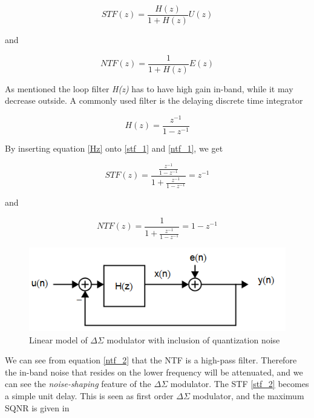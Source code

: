 \begin{equation}\label{stf_1}
    STF(z) = \frac{H(z)}{1+H(z)}U(z)
\end{equation}

and

\begin{equation}\label{ntf_1}
    NTF(z) = \frac{1}{1+H(z)}E(z)
\end{equation}

As mentioned the loop filter \textit{H(z)} has to have high gain in-band, while it may decrease outside. A commonly used filter is the delaying discrete time integrator

\begin{equation}\label{Hz}
    H(z) = \frac{z^{-1}}{1-z^{-1}}
\end{equation}

By inserting equation \ref{Hz} onto \ref{stf_1} and \ref{ntf_1}, we get

\begin{equation}\label{stf_2}
    STF(z) = \frac{\frac{z^{-1}}{1-z^{-1}}}{1 + \frac{z^{-1}}{1-z^{-1}}} = z^{-1}
\end{equation}

and

\begin{equation}\label{ntf_2}
    NTF(z) = \frac{1}{1 + \frac{z^{-1}}{1 - z^{-1}}} = 1 - z^{-1}
\end{equation}

\begin{figure}[h]
\centering
\includegraphics[scale=0.8]{images/linear_delta.png}
\caption{Linear model of $\Delta\Sigma$ modulator with inclusion of quantization noise \cite{Johns}}
\label{fig:linear}
\end{figure}

We can see from equation \ref{ntf_2} that the NTF is a high-pass filter. Therefore the in-band noise that resides on the lower frequency will be attenuated, and we can see the \textit{noise-shaping} feature of the $\Delta\Sigma$ modulator. The STF \ref{stf_2} becomes a simple unit delay. This is seen as first order $\Delta\Sigma$ modulator, and the maximum SQNR is given in \cite[Ch.18.2.2]{Johns}

